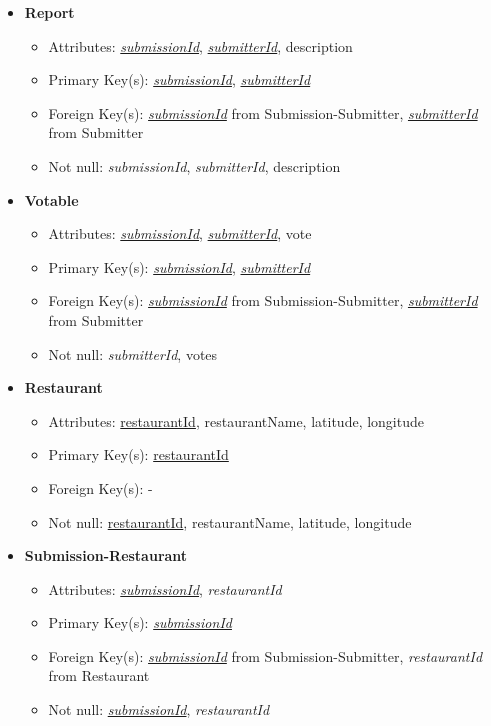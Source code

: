 \documentclass{article}
\begin{document}
\begin{itemize}
        \item \textbf{Report}
        \begin{itemize}
            \item Attributes: \underline{\textit{submissionId}}, \underline{\textit{submitterId}}, description
            \item Primary Key(s): \underline{\textit{submissionId}}, \underline{\textit{submitterId}}
            \item Foreign Key(s): \underline{\textit{submissionId}} from Submission-Submitter, \underline{\textit{submitterId}} from Submitter
            \item Not null: \textit{submissionId}, \textit{submitterId}, description
        \end{itemize}
            
        \item \textbf{Votable} 
        \begin{itemize}
            \item Attributes: \underline{\textit{submissionId}}, \underline{\textit{submitterId}}, vote
            \item Primary Key(s): \underline{\textit{submissionId}}, \underline{\textit{submitterId}}
            \item Foreign Key(s): \underline{\textit{submissionId}} from Submission-Submitter, \underline{\textit{submitterId}} from Submitter
            \item Not null: \textit{submitterId}, votes
        \end{itemize}

        \item \textbf{Restaurant}
        \begin{itemize}
            \item Attributes: \underline{restaurantId}, restaurantName, latitude, longitude
            \item Primary Key(s): \underline{restaurantId}
            \item Foreign Key(s): -
            \item Not null: \underline{restaurantId}, restaurantName, latitude, longitude
        \end{itemize}

        \item \textbf{Submission-Restaurant}
        \begin{itemize}
            \item Attributes: \underline{\textit{submissionId}}, \textit{restaurantId}
            \item Primary Key(s): \underline{\textit{submissionId}}
            \item Foreign Key(s): \underline{\textit{submissionId}} from Submission-Submitter, \textit{restaurantId} from Restaurant
            \item Not null: \underline{\textit{submissionId}}, \textit{restaurantId}
        \end{itemize}


\end{itemize}
\end{document}
